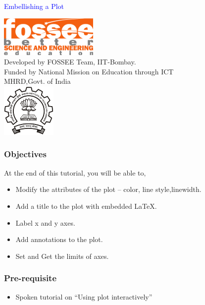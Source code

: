 \documentclass[presentation]{beamer}
\title{}
\author{FOSSEE}
\date{}
\begin{document}
\begin{frame}

\begin{center}
\vspace{12pt}
\textcolor{blue}{\huge Embellishing a Plot}
\end{center}
\vspace{18pt}
\begin{center}
\vspace{10pt}
\includegraphics[scale=0.95]{../images/fossee-logo.png}\\
\vspace{5pt}
\scriptsize Developed by FOSSEE Team, IIT-Bombay. \\ 
\scriptsize Funded by National Mission on Education through ICT\\
\scriptsize  MHRD,Govt. of India\\
\includegraphics[scale=0.30]{../images/iitb-logo.png}\\
\end{center}
\end{frame}
\begin{frame}
\frametitle{Objectives}
\label{sec-2}

  At the end of this tutorial, you will be able to, 

\begin{itemize}
\item Modify the attributes of the plot -- color, line style,linewidth.
\item Add a title to the plot with embedded \LaTeX{}.
\item Label x and y axes.
\item Add annotations to the plot.
\item Set and Get the limits of axes.
\end{itemize}
\end{frame}
\begin{frame}
\frametitle{Pre-requisite}
\label{sec-3}


\begin{itemize}
\item Spoken tutorial on ``Using plot interactively''
\end{itemize}
\end{frame}
\end{document}

